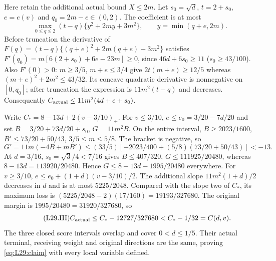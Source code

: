 Here retain the additional actual bound $X\le2m$.
Let $s_0=\sqrt d$, $t=2+s_0$, $e=e(v)$ and
$q_0=2m-e\in(0,2)$. The coefficient is at most
\[
\max_{0\le q\le2}(t-q)\{y^2+2my+3m^2\},\qquad y=\min(q+e,2m).
\]
Before truncation the derivative of
$F(q)=(t-q)\{(q+e)^2+2m(q+e)+3m^2\}$ satisfies
$F'(q_0)=m[6(2+s_0)+6e-23m]\ge0$,
since $46d+6s_0\ge11$ ($s_0\ge43/100$).
Also $F'(0)>0$: $m\ge3/5$, $m+e\le3/4$ give
$2t(m+e)\ge12/5$ whereas $(m+e)^2+2m^2\le43/32$.
Its concave quadratic derivative is nonnegative on $[0,q_0]$;
after truncation the expression is $11m^2(t-q)$ and decreases.
Consequently $C_{\rm actual}\le11m^2(4d+e+s_0)$.

Write $C_*=8-13d+2(v-3/10)_+$.
For $v\le3/10$, $e\le e_0=3/20-7d/20$ and set
$B=3/20+73d/20+s_0$, $G=11m^2B$.
On the entire interval,
$B\ge2023/1600$, $B'\le73/20+50/43$, $3/5\le m\le5/8$.
The bracket is negative, so
\[
G'=11m(-4B+mB')
\le(33/5)[-2023/400+(5/8)(73/20+50/43)]<-13.
\]
At $d=3/16$, $s_0=\sqrt3/4<7/16$ gives
$B\le407/320$, $G\le111925/20480$, whereas
$8-13d=113920/20480$. Hence $G\le8-13d-1995/20480$ everywhere.
For $v\ge3/10$,
$e\le e_0+(1+d)(v-3/10)/2$.
The additional slope $11m^2(1+d)/2$ decreases in $d$ and is at most
$5225/2048$. Compared with the slope two of $C_*$, its maximum loss is
$(5225/2048-2)(17/160)=19193/327680$.
The original margin is $1995/20480=31920/327680$, so
\begin{equation}\tag{L29.III}\label{eq:L29:truncated}
C_{\rm actual}\le C_*-12727/327680<C_*-1/32=C(d,v).
\end{equation}
The three closed score intervals overlap and cover $0<d\le1/5$.
Their actual terminal, receiving weight and original directions are the
same, proving \eqref{eq:L29:claim} with every local variable defined.
